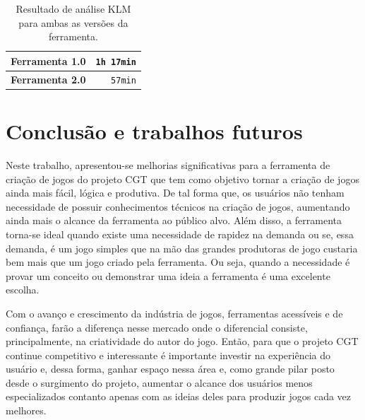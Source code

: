 \documentclass[12pt,oneside,openright,a4paper,english,brazil,sumario=tradicional]{abntex2}
\begin{document}
\begin{table}[h]
   \centering
   \begin{tabular}{|l|r|}
      \hline
      \textbf{Ferramenta 1.0} & \texttt{1h 17min} \\
      \hline
      \textbf{Ferramenta 2.0} & \texttt{57min} \\
      \hline
   \end{tabular}
   \caption{Resultado de análise KLM para ambas as versões da ferramenta.}
   \label{table:resultados}
\end{table}

\chapter{Conclusão e trabalhos futuros}
\label{chap:conclcsao}

Neste trabalho, apresentou-se melhorias significativas para a ferramenta de criação de jogos do projeto CGT que tem como objetivo tornar a criação de jogos ainda mais fácil, lógica e produtiva. De tal forma que, os usuários não tenham necessidade de possuir conhecimentos técnicos na criação de jogos, aumentando ainda mais o alcance da ferramenta ao público alvo. Além disso, a ferramenta torna-se ideal quando existe uma necessidade de rapidez na demanda ou se, essa demanda, é um jogo simples que na mão das grandes produtoras de jogo custaria bem mais que um jogo criado pela ferramenta. Ou seja, quando a necessidade é provar um conceito ou demonstrar uma ideia a ferramenta é uma excelente escolha.

Com o avanço e crescimento da indústria de jogos, ferramentas acessíveis e de confiança, farão a diferença nesse mercado onde o diferencial consiste, principalmente, na criatividade do autor do jogo. Então, para que o projeto CGT continue competitivo e interessante é importante investir na experiência do usuário e, dessa forma, ganhar espaço nessa área e, como grande pilar posto desde o surgimento do projeto, aumentar o alcance dos usuários menos especializados contanto apenas com as ideias deles para produzir jogos cada vez melhores.
\end{document}

